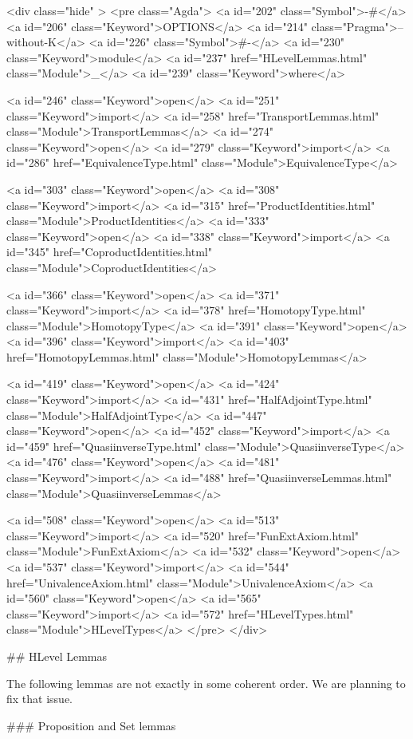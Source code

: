   <div class="hide" >
<pre class="Agda">
<a id="202" class="Symbol">{-#</a> <a id="206" class="Keyword">OPTIONS</a> <a id="214" class="Pragma">--without-K</a> <a id="226" class="Symbol">#-}</a>
<a id="230" class="Keyword">module</a> <a id="237" href="HLevelLemmas.html" class="Module">_</a> <a id="239" class="Keyword">where</a>

<a id="246" class="Keyword">open</a> <a id="251" class="Keyword">import</a> <a id="258" href="TransportLemmas.html" class="Module">TransportLemmas</a>
<a id="274" class="Keyword">open</a> <a id="279" class="Keyword">import</a> <a id="286" href="EquivalenceType.html" class="Module">EquivalenceType</a>

<a id="303" class="Keyword">open</a> <a id="308" class="Keyword">import</a> <a id="315" href="ProductIdentities.html" class="Module">ProductIdentities</a>
<a id="333" class="Keyword">open</a> <a id="338" class="Keyword">import</a> <a id="345" href="CoproductIdentities.html" class="Module">CoproductIdentities</a>

<a id="366" class="Keyword">open</a> <a id="371" class="Keyword">import</a> <a id="378" href="HomotopyType.html" class="Module">HomotopyType</a>
<a id="391" class="Keyword">open</a> <a id="396" class="Keyword">import</a> <a id="403" href="HomotopyLemmas.html" class="Module">HomotopyLemmas</a>

<a id="419" class="Keyword">open</a> <a id="424" class="Keyword">import</a> <a id="431" href="HalfAdjointType.html" class="Module">HalfAdjointType</a>
<a id="447" class="Keyword">open</a> <a id="452" class="Keyword">import</a> <a id="459" href="QuasiinverseType.html" class="Module">QuasiinverseType</a>
<a id="476" class="Keyword">open</a> <a id="481" class="Keyword">import</a> <a id="488" href="QuasiinverseLemmas.html" class="Module">QuasiinverseLemmas</a>

<a id="508" class="Keyword">open</a> <a id="513" class="Keyword">import</a> <a id="520" href="FunExtAxiom.html" class="Module">FunExtAxiom</a>
<a id="532" class="Keyword">open</a> <a id="537" class="Keyword">import</a> <a id="544" href="UnivalenceAxiom.html" class="Module">UnivalenceAxiom</a>
<a id="560" class="Keyword">open</a> <a id="565" class="Keyword">import</a> <a id="572" href="HLevelTypes.html" class="Module">HLevelTypes</a>
</pre>
</div>

## HLevel Lemmas

The following lemmas are not exactly in some coherent order.
We are planning to fix that issue.

### Proposition and Set lemmas

